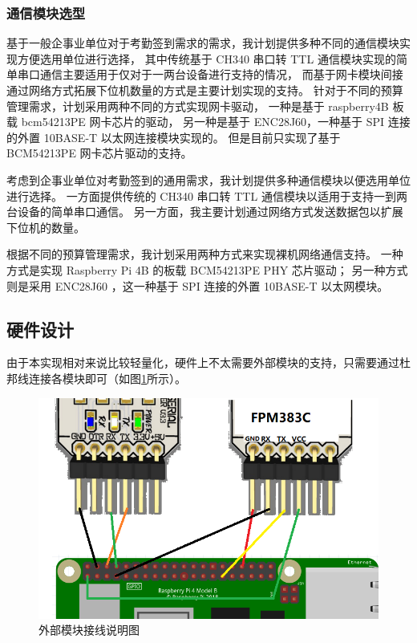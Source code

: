 \subsubsection{通信模块选型}

    基于一般企事业单位对于考勤签到需求的需求，我计划提供多种不同的通信模块实现方便选用单位进行选择，
    其中传统基于 CH340 串口转 TTL 通信模块实现的简单串口通信主要适用于仅对于一两台设备进行支持的情况，
    而基于网卡模块间接通过网络方式拓展下位机数量的方式是主要计划实现的支持。
    针对于不同的预算管理需求，计划采用两种不同的方式实现网卡驱动，
    一种是基于 raspberry4B 板载 bcm54213PE 网卡芯片的驱动，
    另一种是基于 ENC28J60，一种基于 SPI 连接的外置 10BASE-T 以太网连接模块实现的。
    但是目前只实现了基于 BCM54213PE 网卡芯片驱动的支持。

    考虑到企事业单位对考勤签到的通用需求，我计划提供多种通信模块以便选用单位进行选择。
    一方面提供传统的 CH340 串口转 TTL 通信模块以适用于支持一到两台设备的简单串口通信。
    另一方面，我主要计划通过网络方式发送数据包以扩展下位机的数量。

    根据不同的预算管理需求，我计划采用两种方式来实现裸机网络通信支持。
    一种方式是实现 Raspberry Pi 4B 的板载 BCM54213PE PHY 芯片驱动；
    另一种方式则是采用 ENC28J60 ，这一种基于 SPI 连接的外置 10BASE-T 以太网模块。

\subsection{硬件设计}

    由于本实现相对来说比较轻量化，硬件上不太需要外部模块的支持，只需要通过杜邦线连接各模块即可（如图\ref{外部模块接线图}所示）。

    \begin{figure}[ht]
    \centering
    \includegraphics[scale=0.6]{imgs/接线图.png}
    \caption{外部模块接线说明图}    \label{外部模块接线图}
    \end{figure}

